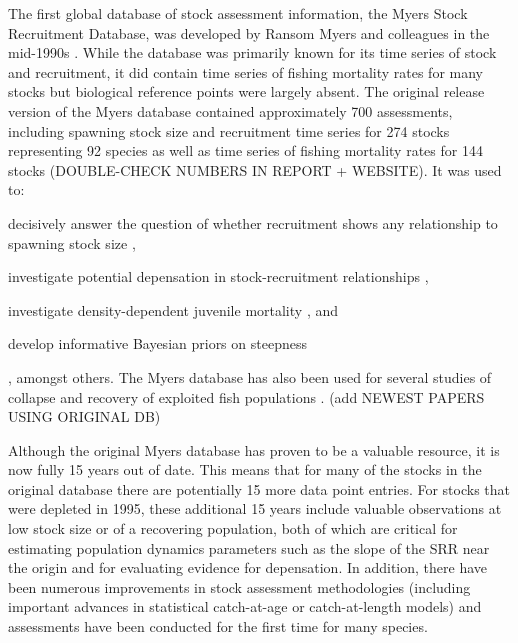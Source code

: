 \documentclass[letterpaper,12pt]{article}
\begin{document}
The first global database of stock assessment information, the Myers
Stock Recruitment Database, was developed by Ransom Myers and
colleagues in the mid-1990s \citep{Myers:etal:1995:summary}.  While
the database was primarily known for its time series of stock and
recruitment, it did contain time series of fishing mortality rates for
many stocks but biological reference points were largely absent. The
original release version of the Myers database
\citep{Myers:etal:1995:summary} contained approximately 700
assessments, including spawning stock size and recruitment time series
for 274 stocks representing 92 species as well as time series of
fishing mortality rates for 144 stocks (DOUBLE-CHECK NUMBERS IN REPORT
+ WEBSITE). It was used to: \begin{inparaenum}[1\upshape)] \item
  decisively answer the question of whether recruitment shows any
  relationship to spawning stock size
  \citep{Myers:Barrowman:1996:fishbull}, \item investigate potential
  depensation in stock-recruitment relationships
  \citep{Myers:etal:1995:science, Liermann:Hilborn:1997:cjfas}, \item
  investigate density-dependent juvenile mortality
  \citep{Myers:2001:ices, Minto:etal:2008:nature}, and \item develop
  informative Bayesian priors on steepness
  \citep{Myers:etal:1999:cjfas, Myers:etal:2002:najfm,
    Dorn:2002:najfm} \end{inparaenum}, amongst others.  The Myers
database has also been used for several studies of collapse and
recovery of exploited fish populations \citep{Hutchings:2000:nature,
  Hutchings:2001:jfishb, Hilborn:1997:csiro}. (add NEWEST PAPERS USING
ORIGINAL DB) \citep{Garvey:etal:2009:cjfas}

Although the original Myers database \citep{Myers:etal:1995:summary}
has proven to be a valuable resource, it is now fully 15 years out of
date.  This means that for many of the stocks in the original database
there are potentially 15 more data point entries.  For stocks that were depleted
in 1995, these additional 15 years include valuable observations at low stock
size or of a recovering population, both of which are critical for estimating population dynamics parameters such as the slope of the SRR near the
origin and for evaluating evidence for depensation.  In addition, there
have been numerous improvements in stock assessment methodologies
(including important advances in statistical catch-at-age or
catch-at-length models) and assessments have been conducted for the
first time for many species.
\end{document}
